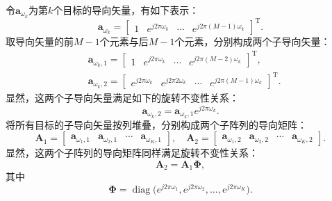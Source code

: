 令\( \bm{a}_{\omega_k} \)为第\( k \)个目标的导向矢量，有如下表示：
\[
    \bm{a}_{\omega_k}
    = \begin{bmatrix}
        1 & e^{j2\pi\omega_k} & \cdots & e^{j2\pi(M-1)\omega_k}
    \end{bmatrix}^{\mathrm{T}}.
\]
取导向矢量的前\( M-1 \)个元素与后\( M-1 \)个元素，分别构成两个子导向矢量：
\[
    \begin{split}
         & \bm{a}_{\omega_k, 1} = \begin{bmatrix}
                                      1 & e^{j2\pi\omega_k} & \cdots & e^{j2\pi(M-2)\omega_k}
                                  \end{bmatrix}^{\mathrm{T}},                  \\
         & \bm{a}_{\omega_k, 2} = \begin{bmatrix}
                                      e^{j2\pi\omega_k} & e^{j2\pi2\omega_k} & \cdots & e^{j2\pi(M-1)\omega_k}
                                  \end{bmatrix}^{\mathrm{T}}.
    \end{split}
\]
显然，这两个子导向矢量满足如下的旋转不变性关系：
\[
    \bm{a}_{\omega_k, 2} = \bm{a}_{\omega_k, 1} e^{j2\pi\omega_k}.
\]
将所有目标的子导向矢量按列堆叠，分别构成两个子阵列的导向矩阵：
\[
    \mathbf{A}_1 = \begin{bmatrix}
        \bm{a}_{\omega_1, 1} & \bm{a}_{\omega_2, 1} & \cdots & \bm{a}_{\omega_K, 1}
    \end{bmatrix}, \quad
    \mathbf{A}_2 = \begin{bmatrix}
        \bm{a}_{\omega_1, 2} & \bm{a}_{\omega_2, 2} & \cdots & \bm{a}_{\omega_K, 2}
    \end{bmatrix}.
\]
显然，这两个子阵列的导向矩阵同样满足旋转不变性关系：
\[
    \mathbf{A}_2 = \mathbf{A}_1 \mathbf{\Phi},
\]
其中
\[
    \mathbf{\Phi} = \operatorname{diag}\big(e^{j2\pi\omega_1}, e^{j2\pi\omega_2}, \ldots, e^{j2\pi\omega_K}\big).
\]

